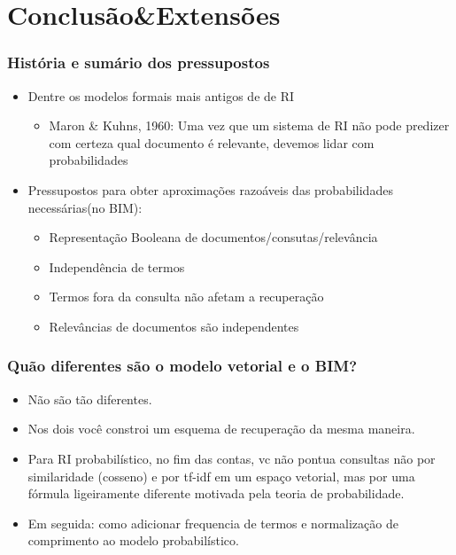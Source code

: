 \documentclass[compress]{beamer}
\begin{document}
\section{Conclusão&Extensões}
\begin{frame}[<+->]
\frametitle{História e sumário dos pressupostos}
\pause[2]

\begin{itemize}
\item Dentre os modelos formais mais antigos de de RI
\begin{itemize}
\item Maron \& Kuhns, 1960: Uma vez que um sistema de RI não pode predizer com certeza  qual documento é relevante, devemos lidar com probabilidades
\end{itemize}

\item Pressupostos para obter aproximações razoáveis das probabilidades necessárias(no BIM):
\begin{itemize}

\item Representação Booleana de documentos/consutas/relevância

\item Independência de termos

\item Termos fora da consulta não afetam a recuperação

\item Relevâncias de documentos são independentes
\end{itemize}
\end{itemize} 
\end{frame}

\begin{frame}[<+->]
\frametitle{Quão diferentes são o modelo vetorial e o BIM?}
\pause[2]

\begin{itemize} 
\item Não são tão diferentes.
\item Nos dois você constroi um esquema de recuperação da mesma maneira.  
\item Para RI probabilístico, no fim das contas, vc não pontua consultas não por similaridade (cosseno) e por tf-idf em um espaço vetorial, mas por uma fórmula ligeiramente diferente motivada pela teoria de probabilidade.
\item Em seguida: como adicionar frequencia de termos e normalização de comprimento ao modelo probabilístico.
\end{itemize}
\end{frame}
\end{document}
